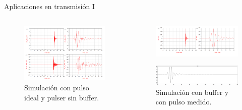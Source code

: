 \documentclass{beamer}
\begin{document}
\begin{frame}{Aplicaciones en transmisión I}

    \begin{columns}[T]
        \begin{column}{0.5\textwidth}
            \begin{figure}[b]
                \centering
                \includegraphics[width=\textwidth]{images/passband_pulser_sim_no_amp_results.png}
                \caption{Simulación con pulso ideal y pulser sin buffer.}
            \end{figure}
            \end{column}
        \begin{column}{0.5\textwidth}
            \begin{figure}[b]
                \centering
                \includegraphics[width=\linewidth]{images/passband_pulser_sim_with_amp_result.png}
            \end{figure}
            \vspace{-0.5cm}
            \begin{figure}[b]
                \centering
                \includegraphics[width=\linewidth]{images/passband_with_measurement_result.png}
                \caption{Simulación con buffer y con pulso medido.}
            \end{figure}
        \end{column}
    \end{columns}

\end{frame}
\end{document}

